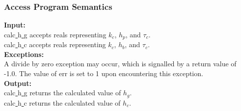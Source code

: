 \documentclass{article}
\begin{document}

\subsubsection*{Access Program Semantics}

\noindent \textbf{Input:}\\
calc\underline{{ }{ }}h\underline{{ }{ }}g accepts reals representing $k_c$, $h_p$, and $\tau_c$.\\
calc\underline{{ }{ }}h\underline{{ }{ }}c accepts reals representing $k_c$, $h_b$, and $\tau_c$.\\


\noindent \textbf{Exceptions:}\\
A divide by zero exception may occur, which is signalled by a return value of -1.0.  The value of err is set to 1 upon encountering this exception.\\

\noindent \textbf{Output:}\\
calc\underline{{ }{ }}h\underline{{ }{ }}g returns the calculated value of $h_g$.\\
calc\underline{{ }{ }}h\underline{{ }{ }}c returns the calculated value of $h_c$.\\
\end{document}

